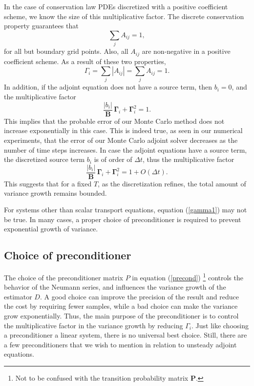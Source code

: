         In the case of conservation law PDEs discretized with a positive
        coefficient scheme, we know the size of this multiplicative factor.
        The discrete conservation property guarantees that
        \[ \sum_j A_{ij} = 1,
        \]
        for all but boundary grid points.  Also, all $A_{ij}$ are non-negative
        in a positive coefficient scheme.  As a result of these two properties,
        \begin{equation} \label{gamma1}
            \Gamma_i = \sum_j |A_{ij}| = \sum_j A_{ij} = 1.
        \end{equation}
        In addition, if the adjoint equation does not have a source term,
        then $b_i = 0$, and the multiplicative factor
        \[ \frac{|b_i|} {\mathbf{B}}\, \mathbf{\Gamma}_i
            + \mathbf{\Gamma}_i^2 = 1.
        \]
        This implies that the probable error of our Monte Carlo method does
        not increase exponentially in this case.  This is indeed true, as
        seen in our numerical experiments, that the error of our Monte Carlo
        adjoint solver decreases as the number of time steps increases.
        In case the adjoint equations have a source term, the discretized
        source term $b_i$ is of order of $\Delta t$, thus the multiplicative
        factor
        \[ \frac{|b_i|} {\mathbf{B}}\, \mathbf{\Gamma}_i
            + \mathbf{\Gamma}_i^2 = 1 + O(\Delta t).
        \]
        This suggests that for a fixed $T$, as the discretization refines,
        the total amount of variance growth remains bounded.

        For systems other than scalar transport equations, equation 
        (\ref{gamma1}) may not be true. In many cases, a proper choice of
        preconditioner is required to prevent exponential growth of variance.



    \subsection{Choice of preconditioner}
        The choice of the preconditioner matrix $P$
        in equation (\ref{precond})
        \footnote{Not to be
        confused with the transition probability matrix $\mathbf{P}$.}
        controls the behavior of the Neumann
        series, and influences the variance growth of the estimator $D$. A
        good choice can improve the precision of the result and reduce the
        cost by requiring fewer samples, while a bad choice can make the
        variance grow exponentially.  Thus, the main purpose of the
        preconditioner is to control the multiplicative factor in the variance
        growth by reducing $\Gamma_i$.  Just like choosing a preconditioner
        a linear system, there is no universal best choice. Still, there are
        a few preconditioners that we wish to mention in relation to
        unsteady adjoint equations.
        
